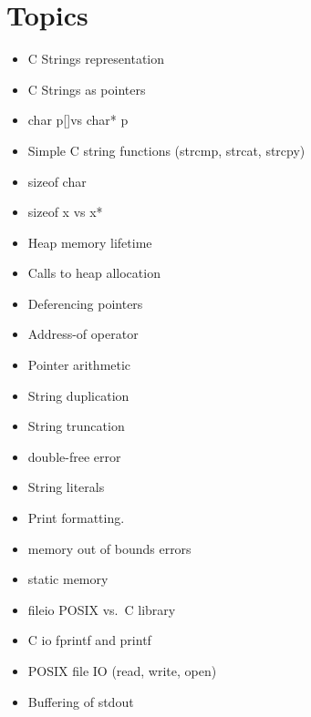 \begin{comment}
\begin{lstlisting}[language=C]
struct __attribute__((packed, aligned(4))) picture{
    int height;
    pixel** data;
    int width;
    char* enconding;
}
// Will look like this
           height       data        width     encoding
           ___ ___ ___ ___ ___ ___ ___ ___ ___ ___ ___ ___
picture = |       |               |       |               |
           ‾‾‾ ‾‾‾ ‾‾‾ ‾‾‾ ‾‾‾ ‾‾‾ ‾‾‾ ‾‾‾ ‾‾‾ ‾‾‾ ‾‾‾ ‾‾‾
\end{lstlisting}

But now, every time I want to access \texttt{data} or \texttt{encoding},
I have to do two memory accesses. The other thing you can do is reorder
the struct, although this is not always possible

\begin{lstlisting}[language=C]
struct picture{
    int height;
    int width;
    pixel** data;
    char* enconding;
}
// You think picture looks like this
           height   width        data         encoding
           ___ ___ ___ ___ ___ ___ ___ ___ ___ ___ ___ ___
picture = |       |       |               |               |
           ‾‾‾ ‾‾‾ ‾‾‾ ‾‾‾ ‾‾‾ ‾‾‾ ‾‾‾ ‾‾‾ ‾‾‾ ‾‾‾ ‾‾‾ ‾‾‾
\end{lstlisting}

\end{comment}

\section{Topics}

\begin{itemize}
\tightlist
\item
  C Strings representation
\item
  C Strings as pointers
\item
  char p{[}{]}vs char* p
\item
  Simple C string functions (strcmp, strcat, strcpy)
\item
  sizeof char
\item
  sizeof x vs x*
\item
  Heap memory lifetime
\item
  Calls to heap allocation
\item
  Deferencing pointers
\item
  Address-of operator
\item
  Pointer arithmetic
\item
  String duplication
\item
  String truncation
\item
  double-free error
\item
  String literals
\item
  Print formatting.
\item
  memory out of bounds errors
\item
  static memory
\item
  fileio POSIX vs.~C library
\item
  C io fprintf and printf
\item
  POSIX file IO (read, write, open)
\item
  Buffering of stdout
\end{itemize}

